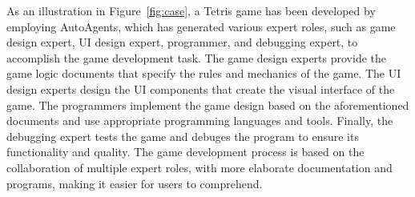 As an illustration in Figure~\ref{fig:case}, a Tetris game has been developed by employing AutoAgents, which has generated various expert roles, such as game design expert, UI design expert, programmer, and debugging expert, to accomplish the game development task. The game design experts provide the game logic documents that specify the rules and mechanics of the game. The UI design experts design the UI components that create the visual interface of the game. The programmers implement the game design based on the aforementioned documents and use appropriate programming languages and tools. Finally, the debugging expert tests the game and debuges the program to ensure its functionality and quality. The game development process is based on the collaboration of multiple expert roles, with more elaborate documentation and programs, making it easier for users to comprehend.